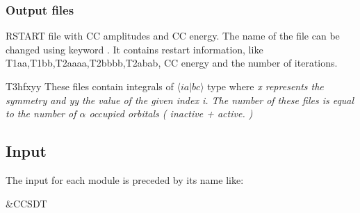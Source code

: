 \subsubsection{Output files}

\begin{filelist}
\item[RSTART]
file with CC amplitudes and CC energy.
The name of the file can be changed using keyword .
It contains restart information, like
T1aa,T1bb,T2aaaa,T2bbbb,T2abab, CC energy and the number of iterations.\\
\item[T3hfxyy]
These files contain integrals of ${\langle ia|bc\rangle}$ type where \it{x}
\rm represents
the symmetry and \it{yy} \rm the value of the given index {\it i}.
 The number of
these files is equal to the number of ${\alpha}$ occupied orbitals
( \it{ inactive + active}. \rm )\\
\end{filelist}

\subsection{Input}
\label{sec:ccsdt_input}

The input for each module is preceded by its name like:
\begin{inputlisting}
 &CCSDT
\end{inputlisting}

